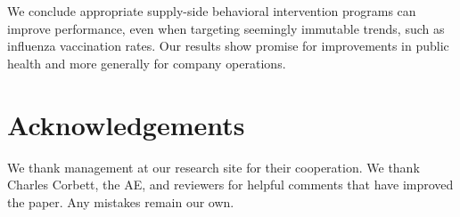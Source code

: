 \begin{onehalfspace}
 We conclude appropriate supply-side behavioral intervention programs can improve performance, even when targeting seemingly immutable trends, such as influenza vaccination rates. Our results show promise for improvements in public health and more generally for company operations.
 

\end{onehalfspace}

\section*{Acknowledgements}
We thank management at our research site for their cooperation. We thank Charles Corbett, the AE, and reviewers for helpful comments that have improved the paper. Any mistakes remain our own.  




\appendix

\titlespacing{\chapter}{0in}{-.38in}{11pt}









% 

